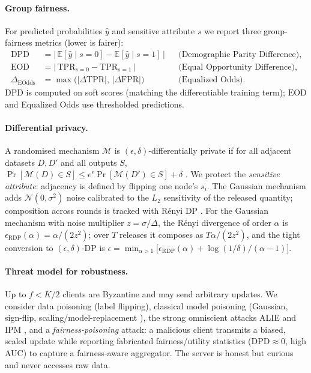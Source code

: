 \documentclass[pdflatex,sn-mathphys-num]{sn-jnl}
\theoremstyle{thmstyleone}%
\theoremstyle{thmstyletwo}%
\theoremstyle{thmstylethree}%
\newcommand{\dpd}{\mathrm{DPD}}
\newcommand{\eod}{\mathrm{EOD}}
\newcommand{\E}{\mathbb{E}}
\begin{document}
\paragraph{Group fairness.}
For predicted probabilities $\hat{y}$ and sensitive attribute $s$ we report
three group-fairness metrics (lower is fairer):
\begin{align}
\dpd &= \big|\,\E[\hat{y}\mid s{=}0]-\E[\hat{y}\mid s{=}1]\,\big|
        &&\text{(Demographic Parity Difference)},\\
\eod &= \big|\,\mathrm{TPR}_{s=0}-\mathrm{TPR}_{s=1}\,\big|
        &&\text{(Equal Opportunity Difference)},\\
\Delta_{\mathrm{EOdds}} &= \max\big(|\Delta\mathrm{TPR}|,\,|\Delta\mathrm{FPR}|\big)
        &&\text{(Equalized Odds)} .
\end{align}
$\dpd$ is computed on soft scores (matching the differentiable training term);
$\eod$ and Equalized Odds use thresholded predictions.

\paragraph{Differential privacy.}
A randomised mechanism $\mathcal{M}$ is $(\epsilon,\delta)$-differentially
private if for all adjacent datasets $D,D'$ and all outputs $S$,
$\Pr[\mathcal{M}(D)\in S]\le e^{\epsilon}\Pr[\mathcal{M}(D')\in S]+\delta$
\cite{dwork2014algorithmic}. We protect the \emph{sensitive attribute}:
adjacency is defined by flipping one node's $s_i$. The Gaussian mechanism adds
$\mathcal{N}(0,\sigma^2)$ noise calibrated to the $L_2$ sensitivity of the
released quantity; composition across rounds is tracked with R\'enyi DP
\cite{mironov2017renyi}. For the Gaussian mechanism with noise multiplier
$z=\sigma/\Delta$, the R\'enyi divergence of order $\alpha$ is
$\epsilon_{\mathrm{RDP}}(\alpha)=\alpha/(2z^2)$; over $T$ releases it composes as
$T\alpha/(2z^2)$, and the tight conversion to $(\epsilon,\delta)$-DP is
$\epsilon=\min_{\alpha>1}\big[\epsilon_{\mathrm{RDP}}(\alpha)+\log(1/\delta)/(\alpha-1)\big]$.

\paragraph{Threat model for robustness.}
Up to $f<K/2$ clients are Byzantine and may send arbitrary updates. We consider
data poisoning (label flipping), classical model poisoning (Gaussian, sign-flip,
scaling/model-replacement \cite{bagdasaryan2020backdoor}), the strong
omniscient attacks ALIE \cite{baruch2019little} and IPM \cite{xie2019fall},
and a \emph{fairness-poisoning} attack: a malicious client transmits a biased,
scaled update while reporting fabricated fairness/utility statistics
($\dpd\!\approx\!0$, high AUC) to capture a fairness-aware aggregator. The
server is honest but curious and never accesses raw data.
\end{document}
